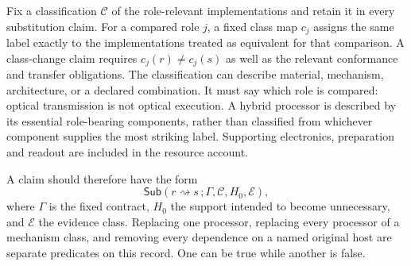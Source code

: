 \documentclass[11pt,a4paper]{article}
\theoremstyle{definition}
\theoremstyle{remark}
\begin{document}
Fix a classification $\mathcal C$ of the role-relevant implementations and retain it in every substitution claim. For a compared role $j$, a fixed class map $c_j$ assigns the same label exactly to the implementations treated as equivalent for that comparison. A class-change claim requires $c_j(r)\ne c_j(s)$ as well as the relevant conformance and transfer obligations. The classification can describe material, mechanism, architecture, or a declared combination. It must say which role is compared: optical transmission is not optical execution. A hybrid processor is described by its essential role-bearing components, rather than classified from whichever component supplies the most striking label. Supporting electronics, preparation and readout are included in the resource account.

A claim should therefore have the form
\begin{equation}\label{eq:profile3}
 \mathsf{Sub}(r\rightsquigarrow s\,;\Gamma,\mathcal C,H_0,\mathcal E),
\end{equation}
where $\Gamma$ is the fixed contract, $H_0$ the support intended to become unnecessary, and $\mathcal E$ the evidence class. Replacing one processor, replacing every processor of a mechanism class, and removing every dependence on a named original host are separate predicates on this record. One can be true while another is false.
\end{document}
